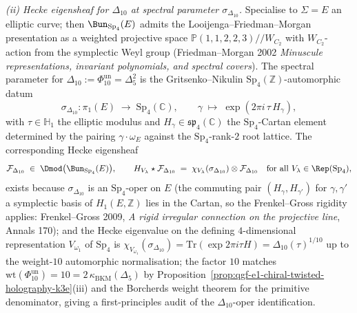 \begin{proposition}
\emph{(ii) Hecke eigensheaf for $\Delta_{10}$ at spectral parameter
$\sigma_{\Delta_{10}}$.} Specialise to $\Sigma=E$ an elliptic curve;
then $\Bun_{\mathrm{Sp}_4}(E)$ admits the Looijenga--Friedman--Morgan
presentation as a weighted projective space
$\mathbb P(1,1,2,2,3)//W_{C_2}$ with $W_{C_2}$-action from the
symplectic Weyl group (Friedman--Morgan 2002 \emph{Minuscule
representations, invariant polynomials, and spectral covers}). The
spectral parameter for
$\Delta_{10}:=\Phi_{10}^{\mathrm{un}}=\Delta_5^2$ is the
Gritsenko--Nikulin $\mathrm{Sp}_4(\mathbb Z)$-automorphic datum
\[
 \sigma_{\Delta_{10}}\colon
 \pi_1(E)\;\longrightarrow\;\mathrm{Sp}_4(\mathbb C),
 \qquad
 \gamma\;\longmapsto\;
 \exp\!\left(2\pi i\,\tau\,H_\gamma\right),
\]
with $\tau\in\mathbb H_1$ the elliptic modulus and
$H_\gamma\in\mathfrak{sp}_4(\mathbb C)$ the $\mathrm{Sp}_4$-Cartan
element determined by the pairing $\gamma\cdot\omega_E$ against the
$\mathrm{Sp}_4$-rank-$2$ root lattice. The corresponding Hecke
eigensheaf
\[
 \mathcal F_{\Delta_{10}}\;\in\;\Dmod\bigl(\Bun_{\mathrm{Sp}_4}(E)\bigr),
 \qquad
 H_{V_\lambda}\star\mathcal F_{\Delta_{10}}
 \;=\;
 \chi_{V_\lambda}(\sigma_{\Delta_{10}})\otimes\mathcal F_{\Delta_{10}}
 \quad
 \text{for all }V_\lambda\in\Rep(\mathrm{Sp}_4),
\]
exists because $\sigma_{\Delta_{10}}$ is an $\mathrm{Sp}_4$-oper on
$E$ (the commuting pair $(H_\gamma,H_{\gamma'})$ for
$\gamma,\gamma'$ a symplectic basis of $H_1(E,\mathbb Z)$ lies in
the Cartan, so the Frenkel--Gross rigidity applies: Frenkel--Gross
2009, \emph{A rigid irregular connection on the projective line},
Annals 170); and the Hecke eigenvalue on the defining
$4$-dimensional representation $V_{\omega_1}$ of $\mathrm{Sp}_4$ is
$\chi_{V_{\omega_1}}(\sigma_{\Delta_{10}})=\mathrm{Tr}(\exp 2\pi i\tau H)
=\Delta_{10}(\tau)^{1/10}$ up to the weight-$10$ automorphic
normalisation; the factor $10$ matches
$\mathrm{wt}(\Phi_{10}^{\mathrm{un}})=10=2\,\kappa_{\mathrm{BKM}}(\Delta_5)$ by
Proposition~\ref{prop:qgf-e1-chiral-twisted-holography-k3e}(iii) and
the Borcherds weight theorem for the primitive denominator, giving a first-principles audit of the
$\Delta_{10}$-oper identification.


\end{proposition}
